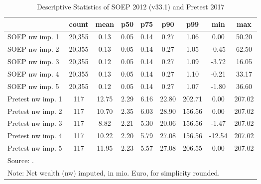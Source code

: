 \begin{table}[htbp]\centering
\def\sym#1{\ifmmode^{#1}\else\(^{#1}\)\fi}
\caption{Descriptive Statistics of SOEP 2012 (v33.1) and Pretest 2017}
\begin{tabular}{l*{1}{cccccccc}}
\hline\hline
                                            &       count&        mean&         p50&         p75&         p90&         p99&         min&         max\\
\hline
SOEP nw imp. 1                              &      20,355&        0.13&        0.05&        0.14&        0.27&        1.06&        0.00&       50.20\\
SOEP nw imp. 2                              &      20,355&        0.13&        0.05&        0.14&        0.27&        1.05&       -0.45&       62.50\\
SOEP nw imp. 3                              &      20,355&        0.12&        0.05&        0.14&        0.27&        1.09&       -3.72&       16.05\\
SOEP nw imp. 4                              &      20,355&        0.13&        0.05&        0.14&        0.27&        1.10&       -0.21&       33.17\\
SOEP nw imp. 5                              &      20,355&        0.12&        0.05&        0.14&        0.27&        1.07&       -1.80&       36.60\\
Pretest nw imp. 1                           &         117&       12.75&        2.29&        6.16&       22.80&      202.71&        0.00&      207.02\\
Pretest nw imp. 2                           &         117&       10.70&        2.35&        6.03&       28.90&      156.56&        0.00&      207.02\\
Pretest nw imp. 3                           &         117&        8.82&        2.21&        5.30&       20.06&      156.56&       -1.47&      207.02\\
Pretest nw imp. 4                           &         117&       10.22&        2.20&        5.79&       27.08&      156.56&      -12.54&      207.02\\
Pretest nw imp. 5                           &         117&       11.95&        2.23&        5.57&       27.08&      206.55&        0.00&      207.02\\
\hline\hline
\multicolumn{9}{l}{\footnotesize Source: .}\\
\multicolumn{9}{l}{\footnotesize Note: Net wealth (nw) imputed, in mio. Euro, for simplicity rounded.}\\
\end{tabular}
\end{table}
